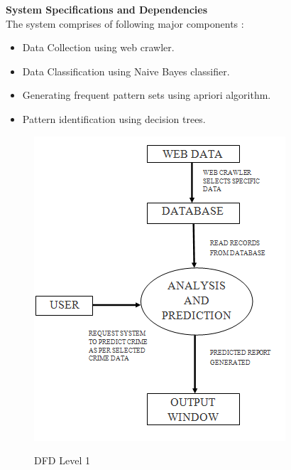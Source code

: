 \newpage
\noindent
\textbf{System Specifications and Dependencies}\\
The system comprises of following major components : 
\begin{itemize}


\item Data Collection using web crawler.
\item Data Classification using Naive Bayes classifier.
\item Generating frequent pattern sets using apriori algorithm.
\item Pattern identification using decision trees.
\end{itemize}

 \begin{figure}[H]
    \centering
  \includegraphics[scale=1.3]{DFDONE.png}\\
  \caption{DFD Level 1}
  
\end{figure}

